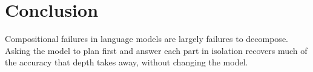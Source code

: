 \chapter{Conclusion}
\label{ch:conclusion}

Compositional failures in language models are largely failures to decompose. Asking the model to
plan first and answer each part in isolation recovers much of the accuracy that depth takes
away, without changing the model.
